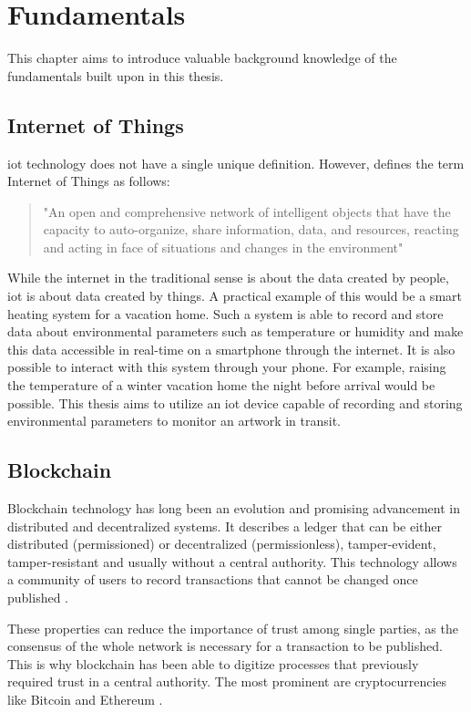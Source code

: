 \chapter{Fundamentals}
\label{chap:technologies}
This chapter aims to introduce valuable background knowledge of the fundamentals built upon in this thesis.

\section{Internet of Things}
\gls{iot} technology does not have a single unique definition. However, \textcite[p. 165]{iot} defines the term Internet of Things as follows:
\begin{quote}
    "An open and comprehensive network of intelligent objects that have the capacity to auto-organize, share information, data, and resources, reacting and acting in face of situations and changes in the environment"
\end{quote}
While the internet in the traditional sense is about the data created by people, \gls{iot} is about data created by things. A practical example of this would be a smart heating system for a vacation home. Such a system is able to record and store data about environmental parameters such as temperature or humidity and make this data accessible in real-time on a smartphone through the internet. It is also possible to interact with this system through your phone. For example, raising the temperature of a winter vacation home the night before arrival would be possible. This thesis aims to utilize an \gls{iot} device capable of recording and storing environmental parameters to monitor an artwork in transit.

\section{Blockchain}
Blockchain technology has long been an evolution and promising advancement in distributed and decentralized systems. It describes a ledger that can be either distributed (permissioned) or decentralized (permissionless), tamper-evident, tamper-resistant and usually without a central authority. This technology allows a community of users to record transactions that cannot be changed once published \parencite{blockchainoverview}.

These properties can reduce the importance of trust among single parties, as the consensus of the whole network is necessary for a transaction to be published. This is why blockchain has been able to digitize processes that previously required trust in a central authority. The most prominent are cryptocurrencies like Bitcoin and Ethereum \cite{bitcoin, ethereum}.

